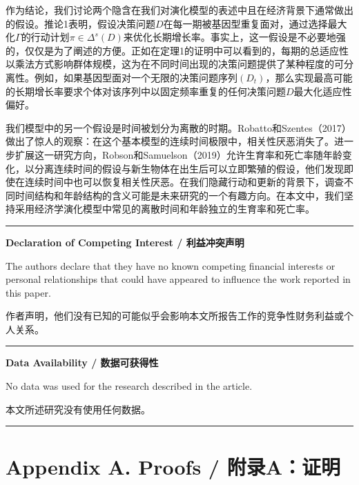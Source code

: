 \documentclass[12pt,a4paper]{article}
\newenvironment{original}
  {\par\noindent\color{black}\smallskip}
  {\par\smallskip}
\newenvironment{translation}
  {\par\noindent\color{blue!70!black}\smallskip}
  {\par\medskip\hrule\medskip}
\begin{document}
\begin{translation}
作为结论，我们讨论两个隐含在我们对演化模型的表述中且在经济背景下通常做出的假设。推论1表明，假设决策问题$D$在每一期被基因型重复面对，通过选择最大化$\Gamma$的行动计划$\pi \in \Delta^s(D)$来优化长期增长率。事实上，这一假设是不必要地强的，仅仅是为了阐述的方便。正如在定理1的证明中可以看到的，每期的总适应性以乘法方式影响群体规模，这为在不同时间出现的决策问题提供了某种程度的可分离性。例如，如果基因型面对一个无限的决策问题序列$(D_t)$，那么实现最高可能的长期增长率要求个体对该序列中以固定频率重复的任何决策问题$D$最大化适应性偏好。

我们模型中的另一个假设是时间被划分为离散的时期。Robatto和Szentes（2017）做出了惊人的观察：在这个基本模型的连续时间极限中，相关性厌恶消失了。进一步扩展这一研究方向，Robson和Samuelson（2019）允许生育率和死亡率随年龄变化，以分离连续时间的假设与新生物体在出生后可以立即繁殖的假设，他们发现即使在连续时间中也可以恢复相关性厌恶。在我们隐藏行动和更新的背景下，调查不同时间结构和年龄结构的含义可能是未来研究的一个有趣方向。在本文中，我们坚持采用经济学演化模型中常见的离散时间和年龄独立的生育率和死亡率。
\end{translation}

\vspace{12pt}
\noindent\textbf{Declaration of Competing Interest / 利益冲突声明}

\begin{original}
The authors declare that they have no known competing financial interests or personal relationships that could have appeared to influence the work reported in this paper.
\end{original}
\begin{translation}
作者声明，他们没有已知的可能似乎会影响本文所报告工作的竞争性财务利益或个人关系。
\end{translation}

\vspace{12pt}
\noindent\textbf{Data Availability / 数据可获得性}

\begin{original}
No data was used for the research described in the article.
\end{original}
\begin{translation}
本文所述研究没有使用任何数据。
\end{translation}
\newpage
\section*{Appendix A. Proofs / 附录A：证明}
\end{document}
